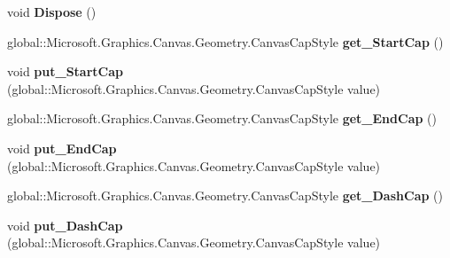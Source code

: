 \begin{DoxyCompactItemize}
void {\bfseries Dispose} ()
\item 
\mbox{\label{class_microsoft_1_1_graphics_1_1_canvas_1_1_geometry_1_1_canvas_stroke_style_ad88c6468f388b2eb08a9719477f05865}} 
global\+::\+Microsoft.\+Graphics.\+Canvas.\+Geometry.\+Canvas\+Cap\+Style {\bfseries get\+\_\+\+Start\+Cap} ()
\item 
\mbox{\label{class_microsoft_1_1_graphics_1_1_canvas_1_1_geometry_1_1_canvas_stroke_style_a7d8f82f4ff8e2d65759fc7359e698584}} 
void {\bfseries put\+\_\+\+Start\+Cap} (global\+::\+Microsoft.\+Graphics.\+Canvas.\+Geometry.\+Canvas\+Cap\+Style value)
\item 
\mbox{\label{class_microsoft_1_1_graphics_1_1_canvas_1_1_geometry_1_1_canvas_stroke_style_ab89db4f7c48a94cfd80ea551415cd2f0}} 
global\+::\+Microsoft.\+Graphics.\+Canvas.\+Geometry.\+Canvas\+Cap\+Style {\bfseries get\+\_\+\+End\+Cap} ()
\item 
\mbox{\label{class_microsoft_1_1_graphics_1_1_canvas_1_1_geometry_1_1_canvas_stroke_style_a7b6afd8e63542d3d893b8ba1dba200df}} 
void {\bfseries put\+\_\+\+End\+Cap} (global\+::\+Microsoft.\+Graphics.\+Canvas.\+Geometry.\+Canvas\+Cap\+Style value)
\item 
\mbox{\label{class_microsoft_1_1_graphics_1_1_canvas_1_1_geometry_1_1_canvas_stroke_style_a4ed5fa2a457de0566e9deccd86297f66}} 
global\+::\+Microsoft.\+Graphics.\+Canvas.\+Geometry.\+Canvas\+Cap\+Style {\bfseries get\+\_\+\+Dash\+Cap} ()
\item 
\mbox{\label{class_microsoft_1_1_graphics_1_1_canvas_1_1_geometry_1_1_canvas_stroke_style_af6dd55589d9a2841f19982e1102a37a3}} 
void {\bfseries put\+\_\+\+Dash\+Cap} (global\+::\+Microsoft.\+Graphics.\+Canvas.\+Geometry.\+Canvas\+Cap\+Style value)
\item 
\mbox{\label{class_microsoft_1_1_graphics_1_1_canvas_1_1_geometry_1_1_canvas_stroke_style_af2b4659e4328e98df4216b6cfc29404c}} 

\end{DoxyCompactItemize}
